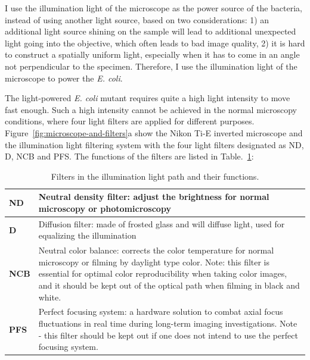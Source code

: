 I use the illumination light of the microscope as the power source of the bacteria, instead of using another light source, based on two considerations: 1) an additional light source shining on the sample will lead to additional unexpected light going into the objective, which often leads to bad image quality, 2) it is hard to construct a spatially uniform light, especially when it has to come in an angle not perpendicular to the specimen. Therefore, I use the illumination light of the microscope to power the \textit{E. coli}.

The light-powered \textit{E. coli} mutant requires quite a high light intensity to move fast enough. Such a high intensity cannot be achieved in the normal microscopy conditions, where four light filters are applied for different purposes. Figure~\ref{fig:microscope-and-filters}a show the Nikon Ti-E inverted microscope and the illumination light filtering system with the four light filters designated as ND, D, NCB and PFS. The functions of the filters are listed in Table.~\ref{table:2-1}:

\begin{table}[h]
	\centering
	\begin{tabular}{ | p{0.4in} | p{5in} |}
		\hline
		\textbf{ND} & Neutral density filter: adjust the brightness for normal microscopy or photomicroscopy \\
		\hline
		\textbf{D} & Diffusion filter: made of frosted glass and will diffuse light, used for equalizing the illumination \\
		\hline
		\textbf{NCB} & Neutral color balance: corrects the color temperature for normal microscopy or filming by daylight type color. Note: this filter is essential for optimal color reproducibility when taking color images, and it should be kept out of the optical path when filming in black and white. \\
		\hline
		\textbf{PFS} & Perfect focusing system: a hardware solution to combat axial focus fluctuations in real time during long-term imaging investigations. Note - this filter should be kept out if one does not intend to use the perfect focusing system.\\
		\hline
	\end{tabular}
	\caption[Filters in the Illumination Light Path and Their Functions.]{Filters in the illumination light path and their functions.}
	\label{table:2-1}
\end{table}

